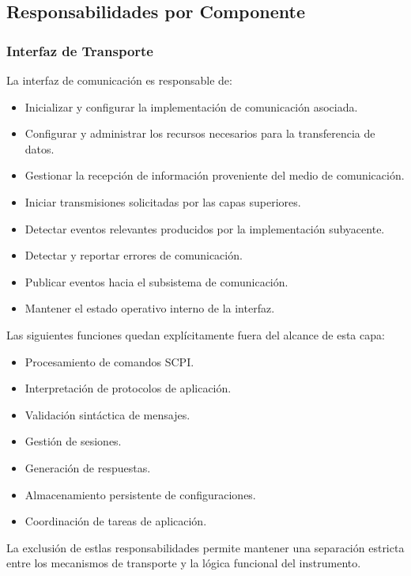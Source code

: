 \subsection{Responsabilidades por Componente}
\label{subsec:responsabilidades-componentes}

\subsubsection{Interfaz de Transporte}

La interfaz de comunicación es responsable de:

\begin{itemize}
\item Inicializar y configurar la implementación de comunicación asociada.
\item Configurar y administrar los recursos necesarios para la transferencia de datos.
\item Gestionar la recepción de información proveniente del medio de comunicación.
\item Iniciar transmisiones solicitadas por las capas superiores.
\item Detectar eventos relevantes producidos por la implementación subyacente.
\item Detectar y reportar errores de comunicación.
\item Publicar eventos hacia el subsistema de comunicación.
\item Mantener el estado operativo interno de la interfaz.
\end{itemize}

Las siguientes funciones quedan explícitamente fuera del alcance de esta capa:

\begin{itemize}
\item Procesamiento de comandos SCPI.
\item Interpretación de protocolos de aplicación.
\item Validación sintáctica de mensajes.
\item Gestión de sesiones.
\item Generación de respuestas.
\item Almacenamiento persistente de configuraciones.
\item Coordinación de tareas de aplicación.
\end{itemize}

La exclusión de estlas responsabilidades permite mantener una separación estricta entre los mecanismos de transporte y la lógica funcional del instrumento.

